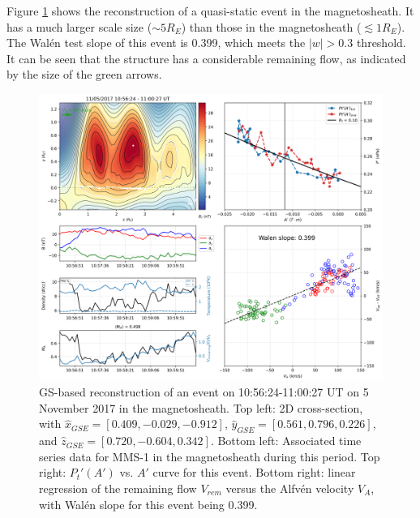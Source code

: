 Figure \ref{fig:reconstruction-Nov2017-quasistatic} shows the reconstruction of a quasi-static event in the magnetosheath. It has a much larger scale size ($\sim 5 R_E$) than those in the magnetosheath ($\lesssim 1 R_E$). The Wal\'en test slope of this event is 0.399, which meets the $|w| > 0.3$ threshold. It can be seen that the structure has a considerable remaining flow, as indicated by the size of the green arrows.
\begin{figure}
    \centering
    \includegraphics[width=\textwidth]{Figures/Reconstructions/timeseries_walenTest_20171105_20171106.png}
    \caption[GS-based event reconstruction for 15 November 2017]{GS-based reconstruction of an event on 10:56:24-11:00:27 UT on 5 November 2017 in the magnetosheath. Top left: 2D cross-section, with $\hat{x}_{GSE}=[0.409, -0.029, -0.912]$, $\hat{y}_{GSE}=[0.561, 0.796, 0.226]$, and $\hat{z}_{GSE}=[0.720, -0.604, 0.342]$. Bottom left: Associated time series data for MMS-1 in the magnetosheath during this period. Top right: $P_t'(A')$ vs. $A'$ curve for this event. Bottom right: linear regression of the remaining flow $V_{rem}$ versus the Alfv\'en velocity $V_A$, with Wal\'en slope for this event being 0.399.} %
    \label{fig:reconstruction-Nov2017-quasistatic}
\end{figure}



